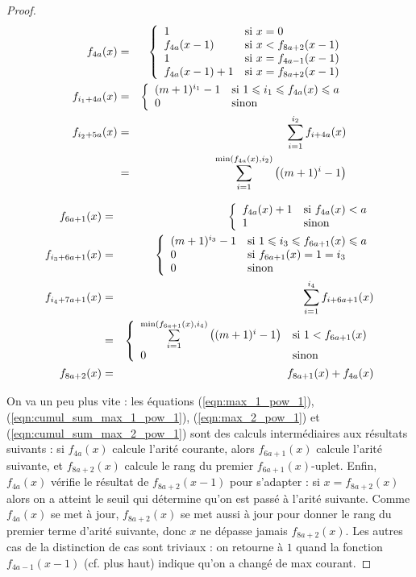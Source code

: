 \documentclass{report}
\begin{document}
\begin{proof}
			\begin{eqnarray}
				f_{4a}(x) & = & \left\lbrace \begin{array}{ll} 
									1 & \text{si $x = 0$} \\
									f_{4a}(x-1) & \text{si $x < f_{8a+2}(x-1)$}\\
									1 & \text{si $x = f_{4a-1}(x-1)$} \\
									f_{4a}(x-1) + 1 & \text{si $x = f_{8a+2}(x-1)$} 
									 \end{array} \right. \label{eqn:f_4a_arite_courante} \\
				f_{i_1+4a}(x) & = & \left\lbrace \begin{array}{ll} 
										(m+1)^{i_1} - 1 & \text{si $1 \leqslant i_1 \leqslant f_{4a}(x) \leqslant a$} \\
										0 & \text{sinon}
										 \end{array} \right. \label{eqn:max_1_pow_1}\\
				f_{i_2+5a}(x) & = & \sum_{i=1}^{i_2} f_{i+4a}(x)\label{eqn:cumul_sum_max_1_pow_1} \\
					& = & \sum_{i=1}^{\min\left(f_{4a}(x), i_2\right)} \left((m+1)^{i} - 1\right) \nonumber\\
			\end{eqnarray}
			
			\begin{eqnarray}
				f_{6a +1}(x) & = & \left\lbrace \begin{array}{ll} 
										f_{4a}(x)+1 & \text{si $f_{4a}(x) < a$} \\
										1 	& \text{sinon}
										 \end{array} \right. \label{eqn:f_4a_arite_suivante}\\
				f_{i_3+6a+1}(x) & = & \left\lbrace \begin{array}{ll} 
										(m+1)^{i_3} - 1 & \text{si $1 \leqslant i_3 \leqslant f_{6a +1}(x) \leqslant a$} \\
										0 & \text{si $f_{6a +1}(x)=1 = i_3$} \\
										0 & \text{sinon} 
										 \end{array} \right. \label{eqn:max_2_pow_1}\\
				f_{i_4+7a+1}(x) & = & \sum_{i=1}^{i_4} f_{i+6a+1}(x)\label{eqn:cumul_sum_max_2_pow_1} \\
					& = & \left\lbrace \begin{array}{ll} 
								\sum\limits_{i=1}^{\min\left(f_{6a+1}(x), i_4\right)} \left((m+1)^{i} - 1\right) & \text{si $1 < f_{6a +1}(x)$} \\
								0 & \text{sinon}
								 \end{array} \right. \nonumber \\
				f_{8a+2}(x) & = & f_{8a+1}(x) + f_{4a}(x) \label{eqn:rang_arite_suivante}
			\end{eqnarray}
			
			
			On va un peu plus vite : les équations (\ref{eqn:max_1_pow_1}), (\ref{eqn:cumul_sum_max_1_pow_1}), (\ref{eqn:max_2_pow_1}) et (\ref{eqn:cumul_sum_max_2_pow_1}) sont des calculs intermédiaires aux résultats suivants : si $f_{4a}(x)$ calcule l'arité courante, alors $f_{6a +1}(x)$ calcule l'arité suivante, et $f_{8a+2}(x)$ calcule le rang du premier $f_{6a +1}(x)$-uplet. Enfin, $f_{4a}(x)$ vérifie le résultat de $f_{8a+2}(x-1)$ pour s'adapter : si $x = f_{8a+2}(x)$ alors on a atteint le seuil qui détermine qu'on est passé à l'arité suivante. Comme $f_{4a}(x)$ se met à jour, $f_{8a+2}(x)$ se met aussi à jour pour donner le rang du premier terme d'arité suivante, donc $x$ ne dépasse jamais $f_{8a+2}(x)$. Les autres cas de la distinction de cas sont triviaux : on retourne à $1$ quand la fonction $f_{4a-1}(x-1)$ (cf. plus haut) indique qu'on a changé de max courant.
			

\end{proof}
\end{document}
